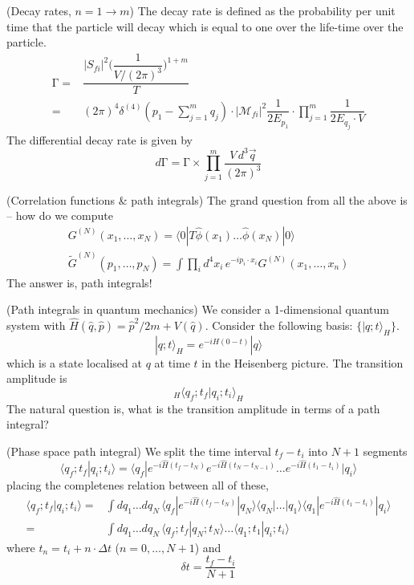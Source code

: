 \vspace{2ex}
\begin{defi}
(Decay rates, $n=1\rightarrow m$) The decay rate is defined as the probability per unit time that the particle will decay which is equal to one over the life-time over the particle.
\[\begin{align*}
\mathrm{\Gamma} =&\dfrac{|S_{fi}|^2\Big(\dfrac{1}{V/(2\pi )^3}\Big)^{1+m}}{T}\\
=&(2\pi )^{4}\delta ^{(4)}(p_1-\sum ^{m}_{j=1}q_{j})\cdot |\mathcal{M}_{fi}|^2\dfrac{1}{2E_{p_1}}\cdot \prod^{m}_{j=1}\dfrac{1}{2E_{q_{j}}\cdot V}
\end{align*}\]
The differential decay rate is given by
\[d\mathrm{\Gamma} =\mathrm{\Gamma} \times \prod^{m}_{j=1}\dfrac{V\,d^3\vec{q}}{(2\pi )^3}\]
\end{defi}
\vspace{2ex}
\begin{rmk}
(Correlation functions \& path integrals) The grand question from all the above is -- how do we compute 
\[\begin{align*}
G^{(N)}(x_1,\ldots ,x_{N})=\langle 0|T\hat{\phi }(x_1)\ldots \hat{\phi }(x_{N})|0\rangle \\
\tilde{G}^{(N)}(p_1,\ldots ,p_{N})=\int \prod_{i}d^{4}x_{i}\,e^{-ip_{i}\cdot x_{i}}G^{(N)}(x_1,\ldots ,x_{n})
\end{align*}\]
The answer is, path integrals!
\end{rmk}
\vspace{2ex}
\begin{rmk}
(Path integrals in quantum mechanics) We consider a 1-dimensional quantum system with $\hat{H}(\hat{q},\hat{p})=\hat{p}^2/2m+V(\hat{q})$. Consider the following basis: $\{|q;t\rangle _{H}\}$.
\[|q;t\rangle _{H}=e^{-i\hat{H}(0-t)}|q\rangle \]
which is a state localised at $q$ at time $t$ in the Heisenberg picture. The transition amplitude is
\[{}_{H}\langle q_{f};t_{f}|q_{i};t_{i}\rangle _{H}\]
The natural question is, what is the transition amplitude in terms of a path integral?
\end{rmk}
\vspace{2ex}
\begin{thm}
(Phase space path integral) We split the time interval $t_{f}-t_{i}$ into $N+1$ segments 
\[\langle q_{f};t_{f}|q_{i};t_{i}\rangle =\langle q_{f}|e^{-i\hat{H}(t_{f}-t_{N})}e^{-i\hat{H}(t_{N}-t_{N-1})}\ldots e^{-i\hat{H}(t_{1}-t_{i})}|q_{i}\rangle \]
placing the completenes relation between all of these,
\[\begin{align*}
\langle q_{f};t_{f}|q_{i};t_{i}\rangle =&\int dq_{1}\ldots dq_{N}\,\langle q_{f}|e^{-i\hat{H}(t_{f}-t_{N})}|q_{N}\rangle \langle q_{N}|\ldots |q_{1}\rangle \langle q_{1}|e^{-i\hat{H}(t_{1}-t_{i})}|q_{i}\rangle \\
=&\int dq_{1}\ldots dq_{N}\,\langle q_{f};t_{f}|q_{N};t_{N}\rangle \ldots \langle q_1;t_1|q_{i};t_{i}\rangle 
\end{align*}\]
where $t_{n}=t_{i}+n\cdot \Delta t$ ($n=0,\ldots ,N+1$) and 
\[\delta t=\dfrac{t_{f}-t_{i}}{N+1}\]
\end{thm}
\vspace{2ex}

